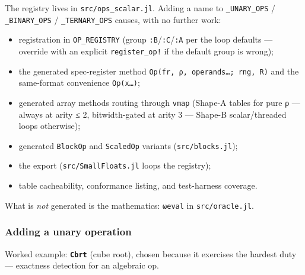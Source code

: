 \label{11509067801894334317-dup1}{}


The registry lives in \texttt{src/ops\_\allowbreak{}scalar.jl}. Adding a name to \texttt{\_\allowbreak{}UNARY\_\allowbreak{}OPS} / \texttt{\_\allowbreak{}BINARY\_\allowbreak{}OPS} / \texttt{\_\allowbreak{}TERNARY\_\allowbreak{}OPS} causes, with no further work:



\begin{itemize}
\item registration in \texttt{OP\_\allowbreak{}REGISTRY} (group \texttt{:B}/\allowbreak\texttt{:C}/\texttt{:A} per the loop defaults — override with an explicit \texttt{register\_\allowbreak{}op!} if the default group is wrong);


\item the generated spec-register method \texttt{Op(\allowbreak{}fr, ρ, operands…; rng, R)} and the same-format convenience \texttt{Op(x…)};


\item generated array methods routing through \texttt{vmap} (Shape-A tables for pure ρ — always at arity ≤ 2, bitwidth-gated at arity 3 — Shape-B scalar/threaded loops otherwise);


\item generated \texttt{BlockOp} and \texttt{ScaledOp} variants (\texttt{src/blocks.jl});


\item the export (\texttt{src/SmallFloats.jl} loops the registry);


\item table cacheability, conformance listing, and test-harness coverage.

\end{itemize}


What is \emph{not} generated is the mathematics: \texttt{ωeval} in \texttt{src/oracle.jl}.



\subsubsection{Adding a unary operation}



\label{8519510493258928519}{}


Worked example: \textbf{\texttt{Cbrt}} (cube root), chosen because it exercises the hardest duty — exactness detection for an algebraic op.



